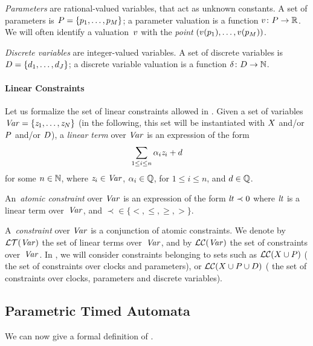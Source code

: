 \emph{Parameters} are rational-valued variables, that act as unknown constants.
A set of parameters is $P = \{ p_1, \dots, p_M \} $;
a parameter valuation is a function $v\colon P \rightarrow {\mathbb R}$.
We will often identify a valuation~$v$ with the \emph{point} $(v(p_1), \dots, v(p_{M}))$.

\emph{Discrete variables} are integer-valued variables.
A set of discrete variables is $D = \{ d_1, \dots, d_J \} $;
a discrete variable valuation is a function $\delta \colon D \rightarrow {\mathbb N}$.


\paragraph{Linear Constraints}
Let us formalize the set of linear constraints allowed in \imitator{}.
Given a set of variables~$\mathit{Var} = \{ \mathit{z}_1, \dots, \mathit{z}_N \}$ (in the following, this set will be instantiated with $X$ and/or $P$ and/or $D$), a \emph{linear term} over $\mathit{Var}$ is an expression of the form
$$
\sum_{1 \leq i \leq n} \alpha_i \mathit{z}_i + d
$$
for some $n \in {\mathbb N}$,
	where
	$\mathit{z}_{i} \in \mathit{Var}$,
	$\alpha_{i} \in {\mathbb Q}$, for $1 \leq i \leq n$,
	and
	$d \in {\mathbb Q}$.

An~\emph{atomic constraint} over $\mathit{Var}$ is an expression of the form
$
\mathit{lt} \prec 0
$
	where
	$\mathit{lt}$ is a linear term over~$\mathit{Var}$,
	and
	$\prec \in \{<, \leq, \geq, >\}$.

A~\emph{constraint} over $\mathit{Var}$ is a conjunction of atomic constraints.
We denote by $\mathcal{LT}(\mathit{Var})$ the set of linear terms over~$\mathit{Var}$, and by $\mathcal{LC}(\mathit{Var})$ the set of constraints over~$\mathit{Var}$.
In \imitator{}, we will consider constraints belonging to sets such as $\mathcal{LC}(X \cup P)$ (\ie{} the set of constraints over clocks and parameters), or $\mathcal{LC}(X \cup P \cup D)$ (\ie{} the set of constraints over clocks, parameters and discrete variables).


\subsection{\imitator{} Parametric Timed Automata}


We can now give a formal definition of \IPTA{}.

